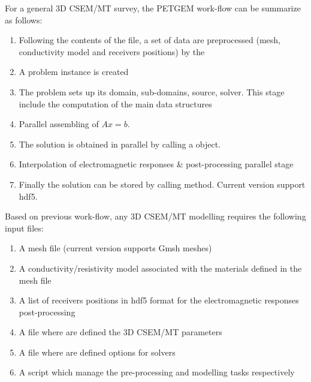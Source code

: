 \documentclass[letterpaper,10pt,english]{sphinxmanual}
\begin{document}
For a general 3D CSEM/MT survey, the PETGEM work-flow can be summarize as follows:
\begin{enumerate}
%
\item {} 
Following the contents of the  file, a set of data are preprocessed (mesh, conductivity model and receivers positions) by the 

\item {} 
A problem instance is created

\item {} 
The problem sets up its domain, sub-domains, source, solver. This stage include the computation of the main data structures

\item {} 
Parallel assembling of \(Ax=b\).

\item {} 
The solution is obtained in parallel by calling a   object.

\item {} 
Interpolation of electromagnetic responses \& post-processing parallel stage

\item {} 
Finally the solution can be stored by calling  method. Current version support hdf5.

\end{enumerate}

Based on previous work-flow, any 3D CSEM/MT modelling requires the following
input files:
\begin{enumerate}
%
\item {} 
A mesh file (current version supports Gmsh meshes)

\item {} 
A conductivity/resistivity model associated with the materials defined in the mesh file

\item {} 
A list of receivers positions in hdf5 format for the electromagnetic responses post-processing

\item {} 
A  file where are defined the 3D CSEM/MT parameters

\item {} 
A  file where are defined options for  solvers

\item {} 
A  script which manage the pre-processing and modelling tasks respectively

\end{enumerate}
\end{document}
